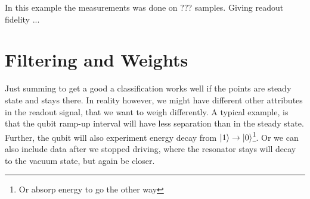 In this example the measurements was done on ??? samples. Giving readout fidelity ...  

\section{Filtering and Weights}
Just summing to get a good a classification works well if the points are steady state and stays there. In reality however, we might have different other attributes in the readout signal, that we want to weigh differently. A typical example, is that the qubit ramp-up interval will have less separation than in the steady state. Further, the qubit will also experiment energy decay from $\ket{1}\to \ket{0}$\footnote{Or absorp energy to go the other way}. Or we can also include data after we stopped driving, where the resonator stays will decay to the vacuum state, but again be closer.

